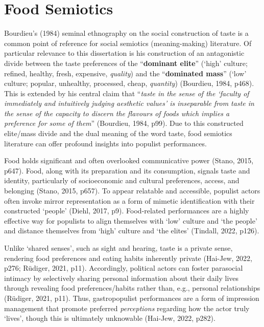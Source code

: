 \documentclass[a4paper, nobind]{templates/ociamthesis}
\begin{document}
\hypertarget{food-semiotics}{%
\section{Food Semiotics}\label{food-semiotics}}

Bourdieu's (1984) seminal ethnography on the social construction of taste is a common point of reference for social semiotics (meaning-making) literature. Of particular relevance to this dissertation is his construction of an antagonistic divide between the taste preferences of the ``\textbf{dominant elite}'' (`high' culture; refined, healthy, fresh, expensive, \emph{quality}) and the ``\textbf{dominated mass}'' (`low' culture; popular, unhealthy, processed, cheap, \emph{quantity}) (Bourdieu, 1984, p468). This is extended by his central claim that ``\emph{taste in the sense of the `faculty of immediately and intuitively judging aesthetic values' is inseparable from taste in the sense of the capacity to discern the flavours of foods which implies a preference for some of them}'' (Bourdieu, 1984, p99). Due to this constructed elite/mass divide and the dual meaning of the word taste, food semiotics literature can offer profound insights into populist performances.

Food holds significant and often overlooked communicative power (Stano, 2015, p647). Food, along with its preparation and its consumption, signals taste and identity, particularly of socioeconomic and cultural preferences, access, and belonging (Stano, 2015, p657). To appear relatable and accessible, populist actors often invoke mirror representation as a form of mimetic identification with their constructed `people' (Diehl, 2017, p9). Food-related performances are a highly effective way for populists to align themselves with `low' culture and `the people' and distance themselves from `high' culture and `the elites' (Tindall, 2022, p126).

Unlike `shared senses', such as sight and hearing, taste is a private sense, rendering food preferences and eating habits inherently private (Hai-Jew, 2022, p276; Rüdiger, 2021, p11). Accordingly, political actors can foster parasocial intimacy by selectively sharing personal information about their daily lives through revealing food preferences/habits rather than, e.g., personal relationships (Rüdiger, 2021, p11). Thus, gastropopulist performances are a form of impression management that promote preferred \emph{perceptions} regarding how the actor truly `lives', though this is ultimately unknowable (Hai-Jew, 2022, p282).
\end{document}
